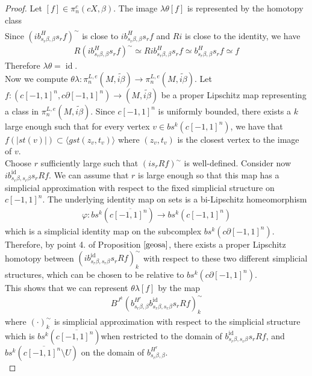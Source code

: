 \documentclass[a4paper,11pt]{article}
\theoremstyle{definition}
\theoremstyle{plain}
\theoremstyle{remark}
\DeclareMathOperator{\id}{id}
\begin{document}
{\begin{proof}
Let $[f]\in \pi_{n}^{c}(cX,\beta)$. The image $\lambda\theta[f]$ is represented by the homotopy class 
\begin{align*}
 [R(ib^H_{s_{r}\beta,\beta}s_{r}f)^{\sim}]
\end{align*}
Since $(ib^H_{s_{r}\beta,\beta}s_{r}f)^{\sim}$ is close to $ib^H_{s_{r}\beta,\beta}s_{r}f$ and $Ri$ is close to the identity, we have
\begin{align*}
R(ib^H_{s_{r}\beta,\beta}s_{r}f)^{\sim} \simeq Rib^H_{s_{r}\beta,\beta}s_{r}f \simeq b^H_{s_{r}\beta,\beta}s_{r}f \simeq f
\end{align*}
Therefore $\lambda\theta=\id$.\\

Now we compute $\theta \lambda:\pi_{n}^{L,e}(M,\widetilde{i\beta})\rightarrow \pi_{n}^{L,e}(M,\widetilde{i\beta})$. Let $f: (c[-1,1]^n,c\partial[-1,1]^n)\rightarrow (M,\widetilde{i\beta})$ be a proper Lipschitz map representing a class in $\pi_{n}^{L,e}(M, \widetilde{i\beta})$. Since $c[-1,1]^n$ is uniformly bounded, there exists a $k$ large enough such that for every vertex $v\in bs^{k}(c [-1,1]^n)$, we have that  $f(|st(v)|) \subset \langle gst(z_v,t_{v}) \rangle$ where $(z_v,t_{v})$ is the closest vertex to the image of $v$. \\

Choose $r$ sufficiently large such that $(is_{r}Rf)^{\sim}$ is well-defined. Consider now $ib^{\id}_{s_{r}\beta,s_{r}\beta} s_{r}Rf$. We can assume that $r$ is large enough so that this map has a simplicial approximation with respect to the fixed simplicial structure on $c[-1,1]^n$. The underlying identity map on sets is a bi-Lipschitz homeomorphism 
\begin{align*}
\varphi: bs^{k}(c\overline{[-1,1]^n})\rightarrow  bs^{k}(c[-1,1]^n)
\end{align*}
which is a simplicial identity map on the subcomplex $ bs^{k}(c\partial[-1,1]^n)$. Therefore, by point 4. of Proposition $\ref{geosa}$, there exists a proper Lipschitz homotopy between $(ib^{\id}_{s_{r}\beta,s_{r}\beta} s_{r}Rf)^{\sim}_{k}$ with respect to these two different simplicial structures, which can be chosen to be relative to $ bs^{k}(c\partial[-1,1]^n)$.\\

This shows that we can represent $\theta\lambda [f]$ by the map
\begin{align*}
B^{J^{k}} (b^{H^{r}}_{s_{r}\beta,\beta} b^{\id}_{s_{r}\beta,s_{r}\beta} s_{r}Rf)^{\sim}_{k}
\end{align*}
where $(\cdot)^{\sim}_{k}$ is simplicial approximation with respect to the simplicial structure which is $bs^{k}(c\overline{[-1,1]^n})$when restricted to the domain of $ b^{\id}_{s_{r}\beta,s_{r}\beta} s_{r}Rf$, and $bs^{k}(c\overline{[-1,1]^n}\setminus U)$ on the domain of $b^{H^{r}}_{s_{r}\beta,\beta} $. \\


\end{proof}}
\end{document}
